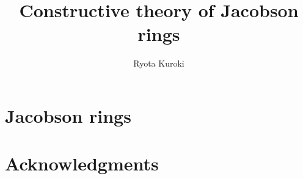 \documentclass{article}
\title{Constructive theory of Jacobson rings}
\author{Ryota Kuroki}
\affil{Graduate School of Mathematical Sciences, The University of Tokyo}
\date{}
\begin{document}
\maketitle
\section{Jacobson rings}
\section*{Acknowledgments}
\end{document}
